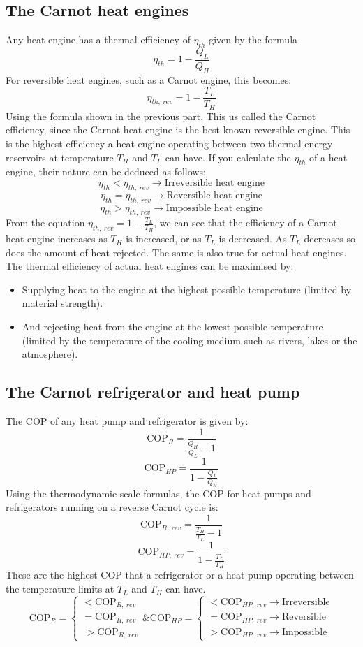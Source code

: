 \documentclass[class=report, crop=false, 12pt,a4paper]{standalone}
\begin{document}
\subsection{The Carnot heat engines}
Any heat engine has a thermal efficiency of $\eta_{th}$ given by the formula
\[ \eta_{th} = 1 - \frac{Q_L}{Q_H} \]
For reversible heat engines, such as a Carnot engine, this becomes:
\[ \eta_{th, \ rev} = 1 - \frac{T_L}{T_H}\]
Using the formula shown in the previous part. This us called the Carnot efficiency, since the Carnot heat engine is the best known reversible engine. This is the highest efficiency a heat engine operating between two thermal energy reservoirs at temperature $T_H$ and $T_L$ can have. If you calculate the $\eta_{th}$ of a heat engine, their nature can be deduced as follows:
\[ \eta_{th} < \eta_{th, \ rev} \rightarrow \textrm{Irreversible heat engine} \]
\[ \eta_{th} = \eta_{th, \ rev} \rightarrow \textrm{Reversible heat engine} \]
\[ \eta_{th} > \eta_{th, \ rev} \rightarrow \textrm{Impossible heat engine} \]
From the equation $\eta_{th, \ rev} = 1 - \frac{T_L}{T_H}$, we can see that the efficiency of a Carnot heat engine increases as $T_H$ is increased, or as $T_L$ is decreased. As $T_L$ decreases so does the amount of heat rejected. The same is also true for actual heat engines. The thermal efficiency of actual heat engines can be maximised by:
\begin{itemize}[noitemsep]
  \item Supplying heat to the engine at the highest possible temperature (limited by material strength).
  \item And rejecting heat from the engine at the lowest possible temperature (limited by the temperature of the cooling medium such as rivers, lakes or the atmosphere).
\end{itemize}
\subsection{The Carnot refrigerator and heat pump}
The COP of any heat pump and refrigerator is given by:
\[ \textrm{COP}_R = \frac{1}{\frac{Q_H}{Q_L} - 1}  \]
\[ \textrm{COP}_{HP} = \frac{1}{1 - \frac{Q_L}{Q_H}} \]
Using the thermodynamic scale formulas, the COP for heat pumps and refrigerators running on a reverse Carnot cycle is:
\[ \textrm{COP}_{R, \ rev} = \frac{1}{\frac{T_H}{T_L} - 1}  \]
\[ \textrm{COP}_{HP, \ rev} = \frac{1}{1 - \frac{T_L}{T_H}} \]
These are the highest COP that a refrigerator or a heat pump operating between the temperature limits at $T_L$ and $T_H$ can have.
\[  
  \textrm{COP}_{R} = 
    \begin{cases}
      < \textrm{COP}_{R, \ rev}\\
      = \textrm{COP}_{R, \ rev}\\\
      > \textrm{COP}_{R, \ rev}
    \end{cases}
  \textrm{\& COP}_{HP} = 
    \begin{cases}
      < \textrm{COP}_{HP, \ rev} \rightarrow \textrm{Irreversible}\\
      = \textrm{COP}_{HP, \ rev} \rightarrow \textrm{Reversible}\\
      > \textrm{COP}_{HP, \ rev} \rightarrow \textrm{Impossible}
    \end{cases}
\]
\end{document}
